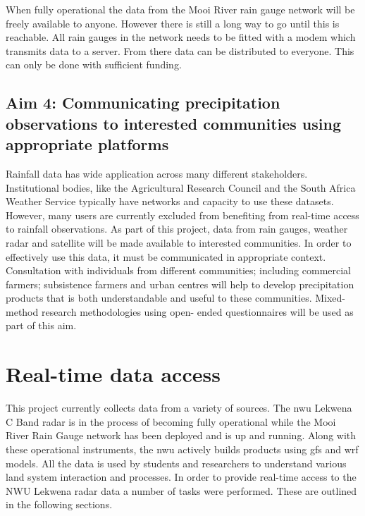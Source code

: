 \documentclass{wrcreport}
\begin{document}
When fully operational the data from the Mooi River rain gauge network
will be freely available to anyone. However there is still a long way
to go until this is reachable. All rain gauges in the network needs to
be fitted with a modem which transmits data to a server. From there
data can be distributed to everyone. This can only be done with
sufficient funding.

\section{Aim 4: Communicating precipitation observations to interested
communities using appropriate platforms}

Rainfall data has wide application across many different stakeholders.
Institutional bodies, like the Agricultural Research Council and the
South Africa Weather Service typically have networks and capacity to
use these datasets. However, many users are currently excluded from
benefiting from real-time access to rainfall observations. As part of
this project, data from rain gauges, weather radar and satellite will
be made available to interested communities. In order to effectively
use this data, it must be communicated in appropriate context.
Consultation with individuals from different communities; including
commercial farmers; subsistence farmers and urban centres will help to
develop precipitation products that is both understandable and useful
to these communities. Mixed-method research methodologies using open-
ended questionnaires will be used as part of this aim.

\chapter{Real-time data access}
\label{chap:real-time}

This project currently collects data from a variety of sources. The
\gls{nwu} Lekwena C Band radar is in the process of becoming fully
operational while the Mooi River Rain Gauge network has been deployed
and is up and running. Along with these operational instruments, the
\gls{nwu} actively builds products using \gls{gfs} and \gls{wrf} models. All
the data is used by students and researchers to understand various
land system interaction and processes. In order to provide real-time
access to the NWU Lekwena radar data a number of tasks were performed.
These are outlined in the following sections.
\end{document}
